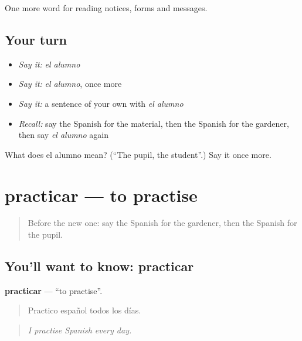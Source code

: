 \begin{grammarlens}[title={What you've built}]
One more word for reading notices, forms and messages.
\end{grammarlens}

\subsection*{Your turn}
\begin{itemize}
\raggedright
  \item \emph{Say it:} \emph{el alumno}
  \item \emph{Say it:} \emph{el alumno}, once more
  \item \emph{Say it:} a sentence of your own with \emph{el alumno}
  \item \emph{Recall:} say the Spanish for the material, then the Spanish for the gardener, then say \emph{el alumno} again
\end{itemize}

\begin{tcolorbox}[breakable,colback=teal!4,colframe=teal!35!black,title={Before you move on}]
What does el alumno mean? (\textquotedblleft{}The pupil, the student\textquotedblright{}.) Say it once more.
\end{tcolorbox}
\section[practicar]{practicar — to practise}

\label{lesson:ES-C476-practicar}



\begin{quote}
Before the new one: say the Spanish for the gardener, then the Spanish for the pupil.
\end{quote}

\subsection*{You'll want to know: practicar}
\textbf{practicar} — \textquotedblleft{}to practise\textquotedblright{}.

\begin{quote}
Practico español todos los días.
\end{quote}

\begin{quote}
\emph{I practise Spanish every day.}
\end{quote}

